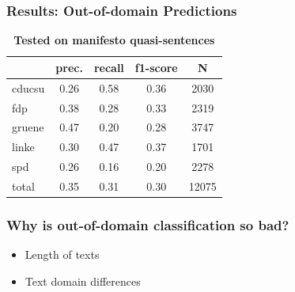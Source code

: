 \documentclass[]{beamer}
\begin{document}
\begin{frame}\frametitle{Results: Out-of-domain Predictions}

\begin{table}[t]
\caption{
\label{tab:results_out-of-domain}
{\bf Tested on manifesto quasi-sentences}}
\begin{center}
\begin{tabular}{lcccc}
    &         prec.    &recall &  f1-score  & N  \\
\hline \hline
    cducsu    &   0.26   &   0.58   &   0.36    &   2030 \\
    fdp    &   0.38   &   0.28   &   0.33    &   2319 \\
     gruene   &    0.47    &  0.20   &   0.28    &  3747\\
      linke     &  0.30  &    0.47    &  0.37    &   1701\\
        spd     &  0.26  &    0.16   &   0.20    &   2278\\
\hline
total    &   0.35  &    0.31  &    0.30   &   12075\\
%
\end{tabular}
\end{center}

\end{table}

\end{frame}

\begin{frame}\frametitle{Why is out-of-domain classification so bad?}
\begin{itemize}
\item Length of texts
\vspace{2em}
\item Text domain differences
\end{itemize}
\end{frame}
\end{document}
